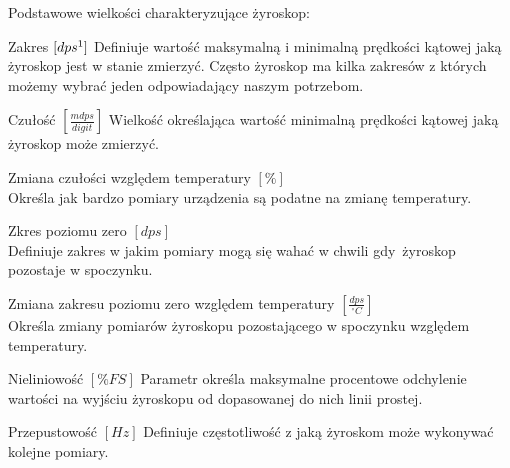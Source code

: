 Podstawowe wielkości charakteryzujące żyroskop:

\begin{basedescript}{\desclabelstyle{\pushlabel}\desclabelwidth{45mm}}
\setlength{\parsep}{2pt}
\setlength{\itemsep}{6mm}
\setlength{\parskip}{2pt}
\item[Zakres {$[dps\footnote{dps - stopień na sekundę}]$}]
	Definiuje wartość maksymalną i minimalną prędkości kątowej jaką żyroskop
	jest w stanie zmierzyć. Często żyroskop ma kilka zakresów z których możemy wybrać jeden odpowiadający naszym potrzebom.
\item[Czułość {$[\frac{mdps}{digit}]$}] 
	Wielkość określająca wartość minimalną prędkości kątowej jaką żyroskop może
	zmierzyć.
\item[Zmiana czułości względem temperatury {$[\%]$}] \hfill \\
	Określa jak bardzo pomiary urządzenia są podatne na zmianę temperatury.
\item[Zkres poziomu zero {$[dps]$}] \hfill \\
	Definiuje zakres w jakim pomiary mogą się wahać w chwili gdy~żyroskop pozostaje
	w spoczynku.
\item[Zmiana zakresu poziomu zero względem temperatury
{$[\frac{dps}{^{\circ}C}]$}] \hfill \\
	Określa zmiany pomiarów żyroskopu pozostającego w spoczynku względem
	temperatury.
\item[Nieliniowość {$[\% FS]$}] 
	Parametr określa maksymalne procentowe odchylenie wartości na wyjściu żyroskopu
	od dopasowanej do nich linii prostej.
\item[Przepustowość {$[Hz]$}] 
	Definiuje częstotliwość z jaką żyroskom może wykonywać kolejne pomiary.
\end{basedescript}

